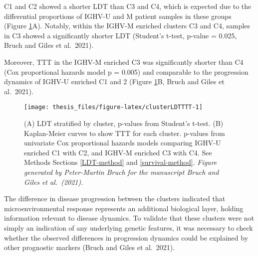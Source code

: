 \documentclass[11pt, a4paper, twosided]{book}
\begin{document}
C1 and C2 showed a shorter LDT than C3 and C4, which is expected due to the differential proportions of IGHV-U and M patient samples in these groups (Figure \ref{fig:clusterLDTTTT}A). Notably, within the IGHV-M enriched clusters C3 and C4, samples in C3 showed a significantly shorter LDT (Student's t-test, p-value = 0.025, Bruch and Giles et al.~2021).

Moreover, TTT in the IGHV-M enriched C3 was significantly shorter than C4 (Cox proportional hazards model p = 0.005) and comparable to the progression dynamics of IGHV-U enriched C1 and 2 (Figure \ref{fig:clusterLDTTTT}B, Bruch and Giles et al.~2021).


\begin{figure}

{\centering \texttt{[image: thesis\_files/figure-latex/clusterLDTTTT-1]} 

}

\caption{(A) LDT stratified by cluster, p-values from Student's t-test. (B) Kaplan-Meier curves to show TTT for each cluster. p-values from univariate Cox proportional hazards models comparing IGHV-U enriched C1 with C2, and IGHV-M enriched C3 with C4. See Methods Sections \ref{LDT-method} and \ref{survival-method}. \emph{Figure generated by Peter-Martin Bruch for the manuscript Bruch and Giles et al.~(2021).}}\label{fig:clusterLDTTTT}
\end{figure}
The difference in disease progression between the clusters indicated that microenvironmental response represents an additional biological layer, holding information relevant to disease dynamics. To validate that these clusters were not simply an indication of any underlying genetic features, it was necessary to check whether the observed differences in progression dynamics could be explained by other prognostic markers (Bruch and Giles et al.~2021).
\end{document}
